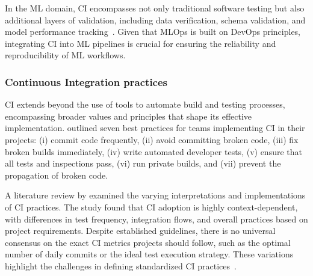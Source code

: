 In the ML domain, CI encompasses not only traditional software testing but also additional layers of validation, including data verification, schema validation, and model performance tracking~\citep{karamitsos2020applying}. Given that MLOps is built on DevOps principles, integrating CI into ML pipelines is crucial for ensuring the reliability and reproducibility of ML workflows.


\subsubsection{Continuous Integration practices}

CI extends beyond the use of tools to automate build and testing processes, encompassing broader values and principles that shape its effective implementation.
\cite{duvall2007continuous} outlined seven best practices for teams implementing CI in their projects: (i) commit code frequently, (ii) avoid committing broken code, (iii) fix broken builds immediately, (iv) write automated developer tests, (v) ensure that all tests and inspections pass, (vi) run private builds, and (vii) prevent the propagation of broken code.

A literature review by \cite{staahl2014modeling} examined the varying interpretations and implementations of CI practices. The study found that CI adoption is highly context-dependent, with differences in test frequency, integration flows, and overall practices based on project requirements. Despite established guidelines, there is no universal consensus on the exact CI metrics projects should follow, such as the optimal number of daily commits or the ideal test execution strategy. These variations highlight the challenges in defining standardized CI practices~\citep{santos2024needMonitorCI}.


